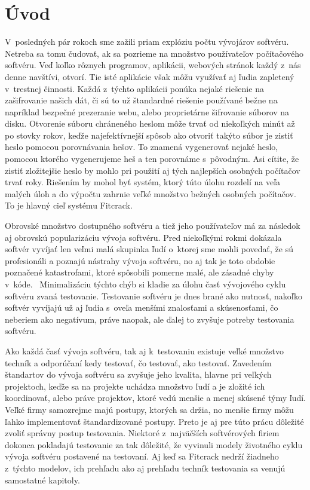 
\chapter{Úvod}
V~posledných pár rokoch sme zažili priam explóziu počtu vývojárov softvéru.
Netreba sa tomu čudovať, ak sa pozrieme na množstvo používateľov počítačového softvéru.
Veď koľko rôznych programov, aplikácii, webových stránok každý z~nás denne navštívi, otvorí.
Tie isté aplikácie však môžu využívať aj ľudia zapletený v~trestnej činnosti.
Každá z~týchto aplikácii ponúka nejaké riešenie na zašifrovanie našich dát, či sú to už štandardné riešenie používané bežne na napríklad bezpečné prezeranie webu, alebo proprietárne šifrovanie súborov na disku.
Otvorenie súboru chráneného heslom môže trvať od niekoľkých minút až po stovky rokov, keďže najefektívnejší spôsob ako otvoriť takýto súbor je zistiť heslo pomocou porovnávania hešov.
To znamená vygenerovať nejaké heslo, pomocou ktorého vygenerujeme heš a ten porovnáme s~pôvodným.
Asi cítite, že zistiť zložitejšie heslo by mohlo pri použití aj tých najlepších osobných počítačov trvať roky.
Riešením by mohol byť systém, ktorý túto úlohu rozdelí na veľa malých úloh a do výpočtu zahrnie veľké množstvo bežných osobných počítačov.
To je hlavný cieľ systému Fitcrack.

Obrovské množstvo dostupného softvéru a tiež jeho používateľov má za následok aj obrovskú popularizáciu vývoja softvéru.
Pred niekoľkými rokmi dokázala softvér vyvíjať len veľmi malá skupinka ľudí o~ktorej sme mohli povedať, že sú profesionáli a poznajú nástrahy vývoja softvéru, no aj tak je toto obdobie poznačené katastrofami, ktoré spôsobili pomerne malé, ale zásadné chyby v~kóde.~\cite{errors} Minimalizáciu týchto chýb si kladie za úlohu časť vývojového cyklu softvéru zvaná testovanie.
Testovanie softvéru je dnes brané ako nutnosť, nakoľko softvér vyvíjajú už aj ľudia s~oveľa menšími znalosťami a skúsenosťami, čo neberiem ako negatívum, práve naopak, ale ďalej to zvyšuje potreby testovania softvéru.

Ako každá časť vývoja softvéru, tak aj k~testovaniu existuje veľké množstvo techník a odporúčaní kedy testovať, čo testovať, ako testovať.
Zavedením štandartov do vývoja softvéru sa zvyšuje jeho kvalita, hlavne pri veľkých projektoch, keďže sa na projekte uchádza množstvo ľudí a je zložité ich koordinovať, alebo práve projektov, ktoré vedú menšie a menej skúsené týmy ľudí.
Veľké firmy samozrejme majú postupy, ktorých sa držia, no menšie firmy môžu ľahko implementovať štandardizované postupy.
Preto je aj pre túto prácu dôležité zvoliť správny postup testovania.
Niektoré z~najväčších softvérových firiem dokonca pokladajú testovanie za tak dôležité, že vyvinuli modely životného cyklu vývoja softvéru postavené na testovaní.
Aj keď sa Fitcrack nedrží žiadneho z~týchto modelov, ich prehľadu ako aj prehľadu techník testovania sa venujú samostatné kapitoly.

